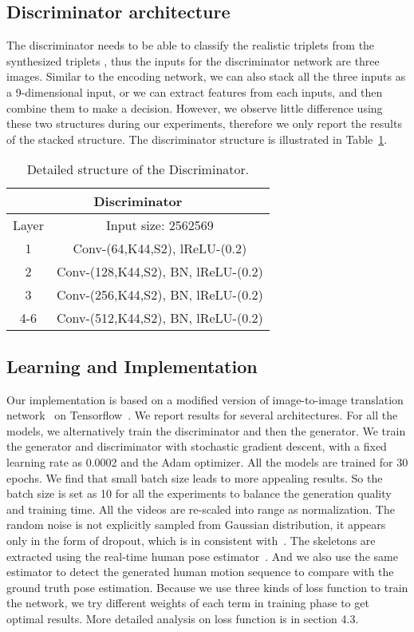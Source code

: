 \documentclass[journal]{IEEEtran}
\begin{document}
\subsection{Discriminator architecture}
The discriminator needs to be able to classify the realistic triplets  from the synthesized triplets , thus the inputs for the discriminator network are three images. Similar to the encoding network, we can also stack all the three inputs as a 9-dimensional input, or we can extract features from each inputs, and then combine them to make a decision. However, we observe little difference using these two structures during our experiments, therefore we only report the results of the stacked structure.
The discriminator structure is illustrated in Table~\ref{discriminator}.

\begin{table}[]
\centering
\caption{Detailed structure of the Discriminator.}
\label{discriminator}
\begin{tabular}{|c|c|}
\hline
\multicolumn{2}{|c|}{\textbf{Discriminator}}                \\ \hline
Layer & Input size: 2562569                       \\ \hline
1     & Conv-(64,K44,S2), lReLU-(0.2)                   \\
2     & Conv-(128,K44,S2), BN, lReLU-(0.2)                  \\
3     & Conv-(256,K44,S2), BN, lReLU-(0.2)                  \\
4-6   & Conv-(512,K44,S2), BN, lReLU-(0.2)                  \\      \hline
\end{tabular}
\end{table}

\subsection{Learning and Implementation}
Our implementation is based on a modified version of image-to-image translation network~\cite{DBLP:journals/corr/IsolaZZE16} on Tensorflow~\cite{DBLP:journals/corr/AbadiABBCCCDDDG16}. We report results for several architectures. For all the models, we alternatively train the discriminator and then the generator. We train the generator and discriminator with stochastic gradient descent, with a fixed learning rate as 0.0002 and the Adam optimizer. All the models are trained for 30 epochs. We find that small batch size leads to more appealing results. So the batch size is set as 10 for all the experiments to balance the generation quality and training time. All the videos are re-scaled into range  as normalization. The random noise  is not explicitly sampled from Gaussian distribution, it appears only in the form of dropout, which is in consistent with~\cite{DBLP:journals/corr/IsolaZZE16}. The skeletons are extracted using the real-time human pose estimator~\cite{cao2016realtime}. And we also use the same estimator to detect the generated human motion sequence to compare with the ground truth pose estimation. Because we use three kinds of loss function to train the network, we try different weights of each term in training phase to get optimal results. More detailed analysis on loss function is in section 4.3.
\end{document}

